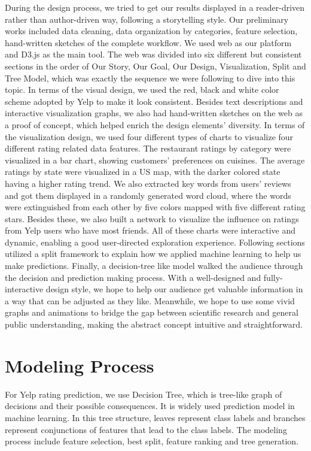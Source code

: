 \documentclass{vgtc}                          %
\begin{document}
During the design process, we tried to get our results displayed in a reader-driven rather than author-driven way, following a storytelling style. Our preliminary works included data cleaning, data organization by categories, feature selection, hand-written sketches of the complete workflow. We used web as our platform and D3.js as the main tool. The web was divided into six different but consistent sections in the order of Our Story, Our Goal, Our Design, Visualization, Split and Tree Model, which was exactly the sequence we were following to dive into this topic. In terms of the visual design, we used the red, black and white color scheme adopted by Yelp to make it look consistent. Besides text descriptions and interactive visualization graphs, we also had hand-written sketches on the web as a proof of concept, which helped enrich the design elements' diversity. In terms of the visualization design, we used four different types of charts to visualize four different rating related data features. The restaurant ratings by category were visualized in a bar chart, showing customers' preferences on cuisines. The average ratings by state were visualized in a US map, with the darker colored state having a higher rating trend. We also extracted key words from users' reviews and got them displayed in a randomly generated word cloud, where the words were extinguished from each other by five colors mapped with five different rating stars. Besides these, we also built a network to visualize the influence on ratings from Yelp users who have most friends. All of these charts were interactive and dynamic, enabling a good user-directed exploration experience. Following sections utilized a split framework to explain how we applied machine learning to help us make predictions. Finally, a decision-tree like model walked the audience through the decision and prediction making process. With a well-designed and fully-interactive design style, we hope to help our audience get valuable information in a way that can be adjusted as they like. Meanwhile, we hope to use some vivid graphs and animations to bridge the gap between scientific research and general public understanding, making the abstract concept intuitive and straightforward.


\section{Modeling Process}


For Yelp rating prediction, we use Decision Tree, which is tree-like graph of decisions and their possible consequences. It is widely used prediction model in machine learning. In this tree structure, leaves represent class labels and branches represent conjunctions of features that lead to the class labels. The modeling process include feature selection, best split, feature ranking and tree generation. 
\end{document}
